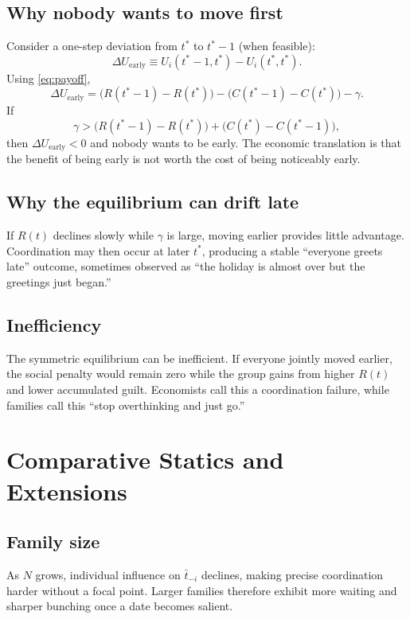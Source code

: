 \documentclass[AER]{AEA}
\begin{document}
\subsection{Why nobody wants to move first}
Consider a one-step deviation from $t^*$ to $t^*-1$ (when feasible):
\[
\Delta U_{\text{early}} \equiv U_i(t^*-1,t^*)-U_i(t^*,t^*) .
\]
Using \eqref{eq:payoff},
\begin{equation}
\Delta U_{\text{early}}
=\big(R(t^*-1)-R(t^*)\big)-\big(C(t^*-1)-C(t^*)\big)-\gamma .
\label{eq:firstmover}
\end{equation}
If
\begin{equation}
\gamma>\big(R(t^*-1)-R(t^*)\big)+\big(C(t^*)-C(t^*-1)\big),
\label{eq:gammaCondition}
\end{equation}
then $\Delta U_{\text{early}}<0$ and nobody wants to be early. The economic translation is that the benefit of being early is not worth the cost of being noticeably early.

\subsection{Why the equilibrium can drift late}
If $R(t)$ declines slowly while $\gamma$ is large, moving earlier provides little advantage. Coordination may then occur at later $t^*$, producing a stable ``everyone greets late'' outcome, sometimes observed as ``the holiday is almost over but the greetings just began.''

\subsection{Inefficiency}
The symmetric equilibrium can be inefficient. If everyone jointly moved earlier, the social penalty would remain zero while the group gains from higher $R(t)$ and lower accumulated guilt. Economists call this a coordination failure, while families call this ``stop overthinking and just go.''

\section{Comparative Statics and Extensions}

\subsection{Family size}
As $N$ grows, individual influence on $\bar t_{-i}$ declines, making precise coordination harder without a focal point. Larger families therefore exhibit more waiting and sharper bunching once a date becomes salient.
\end{document}
